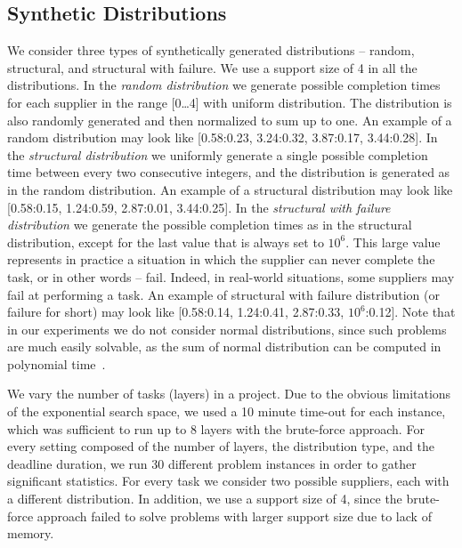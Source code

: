 \documentclass[letterpaper]{article}
\begin{document}
\subsection{Synthetic Distributions}
\label{sec:SynthericDist}
We consider three types of synthetically generated distributions -- random, structural, and structural with failure. We use a support size of 4 in all the distributions. In the \emph{random distribution} we generate possible completion times for each supplier in the range [0\dots 4] with uniform distribution. The distribution is also randomly generated and then normalized to sum up to one. An example of a random distribution may look like [0.58:0.23, 3.24:0.32, 3.87:0.17, 3.44:0.28].
In the \emph{structural distribution} we uniformly generate a single possible completion time between every two consecutive integers, and the distribution is generated as in the random distribution. An example of a structural distribution may look like [0.58:0.15, 1.24:0.59, 2.87:0.01, 3.44:0.25]. In the \emph{structural with failure distribution} we generate the possible completion times as in the structural distribution, except for the last value that is always set to $10^6$. This large value represents in practice a situation in which the supplier can never complete the task, or in other words -- fail. Indeed, in real-world situations, some suppliers may fail at performing a task. An example of structural with failure distribution (or failure for short) may look like [0.58:0.14, 1.24:0.41, 2.87:0.33, $10^6$:0.12].
Note that in our experiments we do not consider normal distributions, since such problems are much easily solvable, as the sum of normal distribution can be computed in polynomial time~\cite{schattenberg2005project,glaubius2009scheduling,olya2014applying}.


We vary the number of tasks (layers) in a project. Due to the obvious limitations of the exponential search space, we used a 10 minute time-out for each instance, which was sufficient to run up to 8 layers with the brute-force approach. For every setting composed of the number of layers, the distribution type, and the deadline duration, we run 30 different problem instances in order to gather significant statistics. For every task we consider two possible suppliers, each with a different distribution. In addition, we use a support size of 4, since the brute-force approach failed to solve problems with larger support size due to lack of memory.
\end{document}
